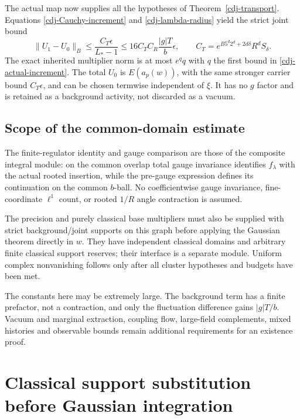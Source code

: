 \documentclass[11pt]{article}
\theoremstyle{remark}
\begin{document}
The actual map now supplies all the hypotheses of
Theorem~\ref{cdj-transport}. Equations
\eqref{cdj-Cauchy-increment} and
\eqref{cdj-lambda-radius} yield the strict joint bound
\begin{equation}\label{cdj-actual-increment}
 \|U_1-U_0\|_B
 \le\frac{C_T\epsilon}{L_*-1}
 \le16 C_T C_R\frac{|g|T}{b}\epsilon,\qquad
 C_T=e^{B5^d2^d+2d\delta}R^dS_\delta.
\end{equation}
The exact inherited multiplier norm is at most $e^q q$
with $q$ the first bound in
\eqref{cdj-actual-increment}. The total $U_0$ is
$E(a_p(w))$, with the same stronger carrier bound
$C_T\epsilon$, and can be chosen termwise independent
of $\xi$. It has no $g$ factor and is retained as a
background activity, not discarded as a vacuum.

\subsection{Scope of the common-domain estimate}
\label{cdj-scope}

The finite-regulator identity and gauge comparison are
those of the composite integral module: on the common
overlap total gauge invariance identifies
$f_\lambda$ with the actual rooted insertion, while
the pre-gauge expression defines its continuation on
the common $b$-ball. No coefficientwise gauge invariance,
fine-coordinate $\ell^1$ count, or rooted $1/R$ angle
contraction is assumed.

The precision and purely classical base multipliers
must also be supplied with strict background/joint
supports on this graph before applying the Gaussian
theorem directly in $w$. They have independent classical
domains and arbitrary finite classical support reserves;
their interface is a separate module. Uniform complex
nonvanishing follows only after all cluster hypotheses
and budgets have been met.

The constants here may be extremely large.
The background term has a finite prefactor, not a
contraction, and only the fluctuation difference gains
$|g|T/b$. Vacuum and marginal extraction, coupling flow,
large-field complements, mixed histories and observable
bounds remain additional requirements for an existence
proof.

\section{Classical support substitution before Gaussian integration}
\label{cdc-section}
\end{document}

